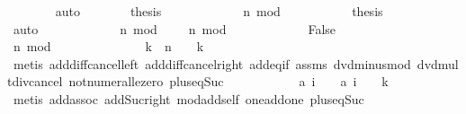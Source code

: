 \begin{isabellebody}
\ \ \ \ \ \ \isamarkupfalse%
\ auto\isanewline
\ \ \ \ \isamarkupfalse%
\ \isamarkupfalse%
\ {\isacharquery}thesis\isanewline
\ \ \ \ \isamarkupfalse%
\isanewline
\ \ \ \ \ \ \isamarkupfalse%
\ {\isachardoublequoteopen}n\ mod\ {}\ {\isacharequal}\ {}{\isachardoublequoteclose}\isanewline
\ \ \ \ \ \ \isamarkupfalse%
\ {\isacharquery}thesis\isanewline
\ \ \ \ \ \ \ \ \isamarkupfalse%
\ auto\isanewline
\ \ \ \ \isamarkupfalse%
\isanewline
\ \ \ \ \ \ \isamarkupfalse%
\ {\isachardoublequoteopen}n\ mod\ {}\ {\isacharequal}\ {}\ {\isasymor}\ n\ mod\ {}\ {\isacharequal}\ {}{\isachardoublequoteclose}\isanewline
\ \ \ \ \ \ \isamarkupfalse%
\ \isamarkupfalse%
\ False\isanewline
\ \ \ \ \ \ \isamarkupfalse%
\isanewline
\ \ \ \ \ \ \ \ \isamarkupfalse%
\ {\isachardoublequoteopen}n\ mod\ {}\ {\isacharequal}\ {}{\isachardoublequoteclose}\isanewline
\ \ \ \ \ \ \ \ \isamarkupfalse%
\ \isamarkupfalse%
\ k\ \ {\isachardoublequoteopen}n\ {\isacharequal}\ {}\ {\isacharasterisk}\ k\ {\isacharplus}\ {}{\isachardoublequoteclose}\isanewline
\ \ \ \ \ \ \ \ \ \ \isamarkupfalse%
\ {\isacharparenleft}metis\ add{\isacharunderscore}diff{\isacharunderscore}cancel{\isacharunderscore}left{\isacharprime}\ add{\isacharunderscore}diff{\isacharunderscore}cancel{\isacharunderscore}right{\isacharprime}\ add{\isacharunderscore}eq{\isacharunderscore}if\ assms\ dvd{\isacharunderscore}minus{\isacharunderscore}mod\ dvd{\isacharunderscore}mult{\isacharunderscore}div{\isacharunderscore}cancel\ not{\isacharunderscore}numeral{\isacharunderscore}le{\isacharunderscore}zero\ plus{\isacharunderscore}{}{\isacharunderscore}eq{\isacharunderscore}Suc{\isacharparenright}\isanewline
\ \ \ \ \ \ \ \ \isamarkupfalse%
\ \isamarkupfalse%
\ {\isachardoublequoteopen}{\isacharquery}a\ {\isacharparenleft}i\ {\isacharplus}\ {}{\isacharparenright}\ {\isacharequal}\ {\isacharquery}a\ {\isacharparenleft}i\ {\isacharplus}\ {}\ {\isacharplus}\ {}{\isacharasterisk}k{\isacharparenright}{\isachardoublequoteclose}\isanewline
\ \ \ \ \ \ \ \ \ \ \isamarkupfalse%
\ {\isacharparenleft}metis\ add{\isachardot}assoc\ add{\isacharunderscore}Suc{\isacharunderscore}right\ mod{\isacharunderscore}add{\isacharunderscore}self{}\ one{\isacharunderscore}add{\isacharunderscore}one\ plus{\isacharunderscore}{}{\isacharunderscore}eq{\isacharunderscore}Suc{\isacharparenright}\isanewline

\end{isabellebody}
